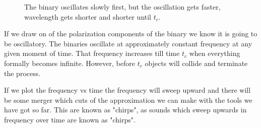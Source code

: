 \documentclass[11pt]{article}
\begin{document}
\begin{figure} [H]
\begin{center}


        \caption{ The binary oscillates slowly first, but the oscillation gets faster, wavelength gets shorter and shorter until $t_c$. }
            \end{center}
    \end{figure}


If we draw on of the polarization components of the binary we know it is going to be oscillatory. The binaries oscillate at approximately constant frequency at any given moment of time. That frequency increases till time $t_c$ when everything formally becomes infinite. However, before $t_c$ objects will collide and terminate the process.

If we plot the frequency vs time the frequency will sweep upward and there will be some merger which cuts of the approximation we can make with the tools we have got so far. This are known as "chirps", as sounds which sweep upwards in frequency over time are known as "chirps".
\end{document}
